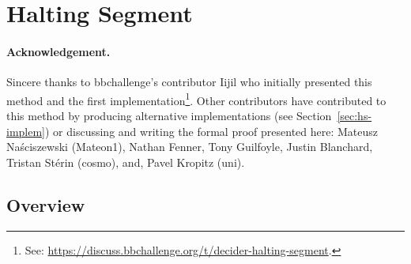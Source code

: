 
\newcommand{\HS}{Halting Segment\xspace}

\newpage
\section{Halting Segment}\label{sec:halting-segment}

\paragraph{Acknowledgement.} Sincere thanks to bbchallenge's contributor Iijil who initially presented this method and the first implementation\footnote{See: \url{https://discuss.bbchallenge.org/t/decider-halting-segment}.}. Other contributors have contributed to this method by producing alternative implementations (see Section~\ref{sec:hs-implem}) or discussing and writing the formal proof presented here: Mateusz Naściszewski (Mateon1), Nathan Fenner, Tony Guilfoyle, Justin Blanchard, Tristan Stérin (cosmo), and, Pavel Kropitz (uni).

\subsection{Overview}

